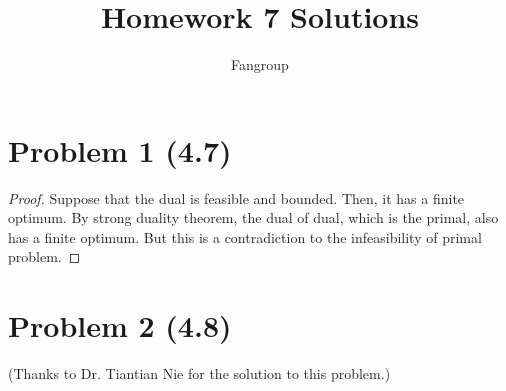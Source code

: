 \documentclass[12pt]{article}
\begin{document}
 
 
\title{Homework 7 Solutions}
\author{Fangroup}
\maketitle

\section*{Problem 1 (4.7)}

\begin{proof}

Suppose that the dual is feasible and bounded. Then, it has a finite optimum. By strong duality theorem, the dual of dual, which is the primal, also has a finite optimum. But this is a contradiction to the infeasibility of primal problem.

\end{proof}

\section*{Problem 2 (4.8)}

(Thanks to Dr. Tiantian Nie for the solution to this problem.)
\end{document}
